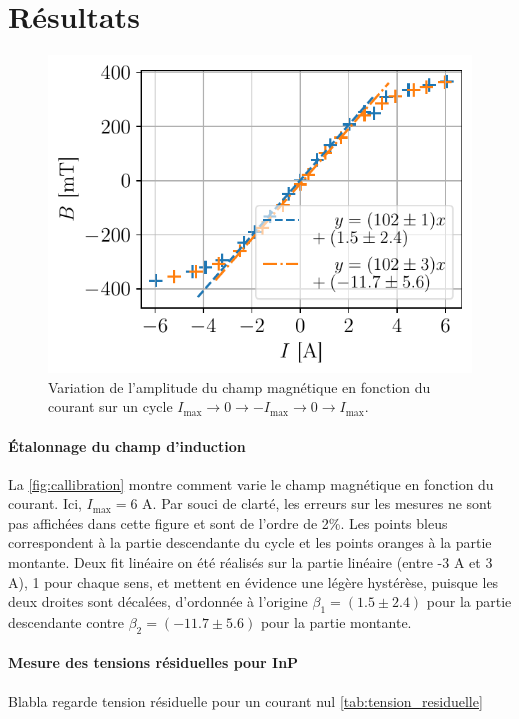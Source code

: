 \section{Résultats}

\begin{minipage}{\textwidth}
    \begin{figure}
        \includegraphics[width=\linewidth]{figures/calibration.pdf}
        \caption{Variation de l'amplitude du champ magnétique en fonction du courant sur un cycle \(I_\textrm{max} \rightarrow 0 \rightarrow -I_\textrm{max} \rightarrow 0 \rightarrow I_\textrm{max}\).}
        \label{fig:callibration}
    \end{figure}

    \paragraph*{Étalonnage du champ d'induction}
    La \autoref{fig:callibration} montre comment varie le champ magnétique en fonction du courant. Ici, \(I_\textrm{max} = 6\) \si{\ampere}. Par souci de clarté, les erreurs sur les mesures ne sont pas affichées dans cette figure et sont de l'ordre de 2\%. Les points bleus correspondent à la partie descendante du cycle et les points oranges à la partie montante. Deux fit linéaire on été réalisés sur la partie linéaire (entre -3 \si{\ampere} et 3 \si{\ampere}), 1 pour chaque sens, et mettent en évidence une légère hystérèse, puisque les deux droites sont décalées, d'ordonnée à l'origine \(\beta_1 = (1.5 \pm 2.4)\) pour la partie descendante contre \(\beta_2 = (-11.7 \pm 5.6)\) pour la partie montante.

    \paragraph*{Mesure des tensions résiduelles pour InP}
    Blabla regarde tension résiduelle pour un courant nul \autoref{tab:tension_residuelle}
\end{minipage}

